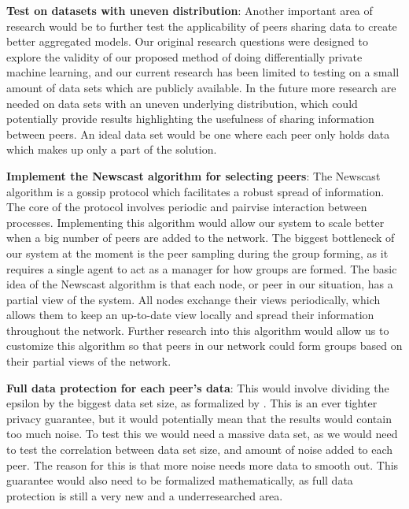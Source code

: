 \vspace{2mm}
\noindent
\textbf{Test on datasets with uneven distribution}: Another important area of research would be to further test the applicability of peers sharing data to create better aggregated models. Our original research questions were designed to explore the validity of our proposed method of doing differentially private machine learning, and our current research has been limited to testing on a small amount of data sets which are publicly available. In the future more research are needed on data sets with an uneven underlying distribution, which could potentially provide results highlighting the usefulness of sharing information between peers. An ideal data set would be one where each peer only holds data which makes up only a part of the solution. 

\vspace{2mm}
\noindent
\textbf{Implement the Newscast algorithm for selecting peers}: The Newscast algorithm is a gossip protocol which facilitates a robust spread of information. The core of the protocol involves periodic and pairvise interaction between processes. Implementing this algorithm would allow our system to scale better when a big number of peers are added to the network. The biggest bottleneck of our system at the moment is the peer sampling during the group forming, as it requires a single agent to act as a manager for how groups are formed. The basic idea of the Newscast algorithm is that each node, or peer in our situation, has a partial view of the system. All nodes exchange their views periodically, which allows them to keep an up-to-date view locally and spread their information throughout the network. Further research into this algorithm would allow us to customize this algorithm so that peers in our network could form groups based on their partial views of the network. 

\vspace{2mm}
\noindent
\textbf{Full data protection for each peer's data}: This would involve dividing the epsilon by the biggest data set size, as formalized by \cite{dwork2013algorithmic}. This is an ever tighter privacy guarantee, but it would potentially mean that the results would contain too much noise. To test this we would need a massive data set, as we would need to test the correlation between data set size, and amount of noise added to each peer. The reason for this is that more noise needs more data to smooth out. This guarantee would also need to be formalized mathematically, as full data protection is still a very new and a underresearched area.   

